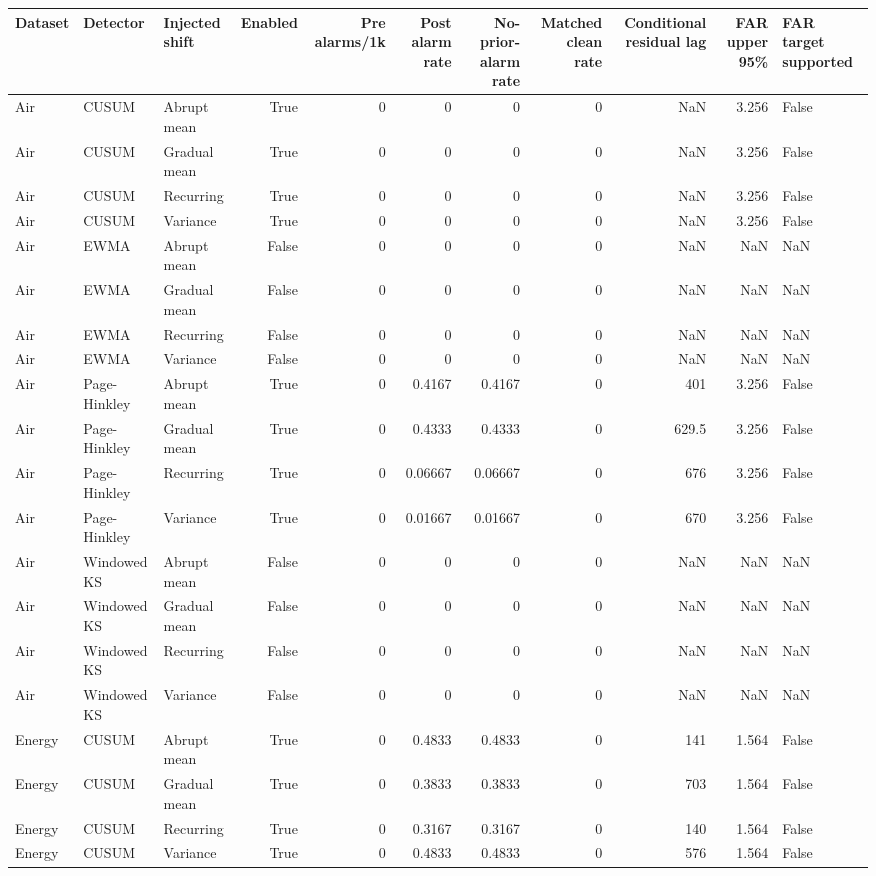 \begin{tabular}{lllrrrrrrrl}
\toprule
Dataset & Detector & Injected shift & Enabled & Pre alarms/1k & Post alarm rate & No-prior-alarm rate & Matched clean rate & Conditional residual lag & FAR upper 95\% & FAR target supported \\
\midrule
Air & CUSUM & Abrupt mean & True & 0 & 0 & 0 & 0 & NaN & 3.256 & False \\
Air & CUSUM & Gradual mean & True & 0 & 0 & 0 & 0 & NaN & 3.256 & False \\
Air & CUSUM & Recurring & True & 0 & 0 & 0 & 0 & NaN & 3.256 & False \\
Air & CUSUM & Variance & True & 0 & 0 & 0 & 0 & NaN & 3.256 & False \\
Air & EWMA & Abrupt mean & False & 0 & 0 & 0 & 0 & NaN & NaN & NaN \\
Air & EWMA & Gradual mean & False & 0 & 0 & 0 & 0 & NaN & NaN & NaN \\
Air & EWMA & Recurring & False & 0 & 0 & 0 & 0 & NaN & NaN & NaN \\
Air & EWMA & Variance & False & 0 & 0 & 0 & 0 & NaN & NaN & NaN \\
Air & Page-Hinkley & Abrupt mean & True & 0 & 0.4167 & 0.4167 & 0 & 401 & 3.256 & False \\
Air & Page-Hinkley & Gradual mean & True & 0 & 0.4333 & 0.4333 & 0 & 629.5 & 3.256 & False \\
Air & Page-Hinkley & Recurring & True & 0 & 0.06667 & 0.06667 & 0 & 676 & 3.256 & False \\
Air & Page-Hinkley & Variance & True & 0 & 0.01667 & 0.01667 & 0 & 670 & 3.256 & False \\
Air & Windowed KS & Abrupt mean & False & 0 & 0 & 0 & 0 & NaN & NaN & NaN \\
Air & Windowed KS & Gradual mean & False & 0 & 0 & 0 & 0 & NaN & NaN & NaN \\
Air & Windowed KS & Recurring & False & 0 & 0 & 0 & 0 & NaN & NaN & NaN \\
Air & Windowed KS & Variance & False & 0 & 0 & 0 & 0 & NaN & NaN & NaN \\
Energy & CUSUM & Abrupt mean & True & 0 & 0.4833 & 0.4833 & 0 & 141 & 1.564 & False \\
Energy & CUSUM & Gradual mean & True & 0 & 0.3833 & 0.3833 & 0 & 703 & 1.564 & False \\
Energy & CUSUM & Recurring & True & 0 & 0.3167 & 0.3167 & 0 & 140 & 1.564 & False \\
Energy & CUSUM & Variance & True & 0 & 0.4833 & 0.4833 & 0 & 576 & 1.564 & False \\

\end{tabular}
